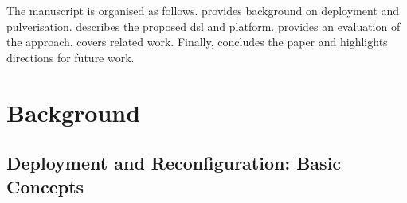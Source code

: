 \documentclass[conference]{IEEEtran}
\begin{document}
The manuscript is organised as follows.
%
 provides background on deployment and pulverisation.
%
 describes the proposed \ac{dsl} and platform.
%
 provides an evaluation of the approach.
%
 covers related work.
%
Finally,  concludes the paper and highlights directions for future work.

\section{Background}\label{sec:background}

\subsection{Deployment and Reconfiguration: Basic Concepts}\label{sec:background:dep}
\end{document}
